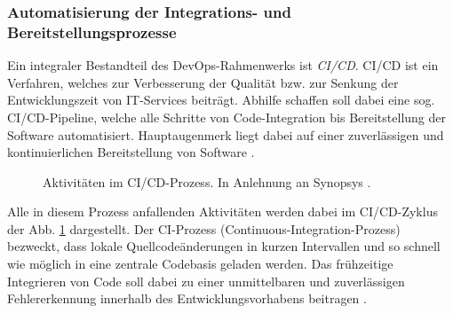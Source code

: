 \subsubsection{Automatisierung der Integrations- und Bereitstellungsprozesse}
\label{sec:CICD}
 Ein integraler Bestandteil des DevOps-Rahmen\-werks ist \textit{\ac{CI/CD}}. CI/CD ist ein Verfahren, welches zur Verbesserung der Qualität bzw. zur Senkung der Entwicklungszeit von IT-Services beiträgt. Abhilfe schaffen soll dabei eine sog. CI/CD-Pipeline, welche alle Schritte von Code-Integration bis Bereitstellung der Software automatisiert. Hauptaugenmerk liegt dabei auf einer zuverlässigen und kontinuierlichen Bereitstellung von Software \cite[471]{Zampetti.92720211012021}.
\begin{center}
	\begin{figure}[H]
		\centering
		\captionsetup{format=myformat}
		\caption[Aktivitäten im CI/CD-Prozess]{Aktivitäten im CI/CD-Prozess. In Anlehnung an Synopsys \cite{.20230201}.}
		\label{fig:CICD_Cycle}
	\end{figure}
\end{center}
\vspace*{-15mm}
Alle in diesem Prozess anfallenden Aktivitäten werden dabei im CI/CD-Zyklus der Abb. \ref*{fig:CICD_Cycle} dargestellt. Der \acs{CI}-Prozess (Continuous-Integration-Prozess) bezweckt, dass lokale Quellcode\-änderungen in kurzen Intervallen und so schnell wie möglich in eine zentrale Codebasis geladen werden. Das frühzeitige Integrieren von Code soll dabei zu einer unmittelbaren und zuverlässigen Fehlererkennung innerhalb des Entwicklungsvorhabens beitragen \cite[471]{Zampetti.92720211012021}. 
